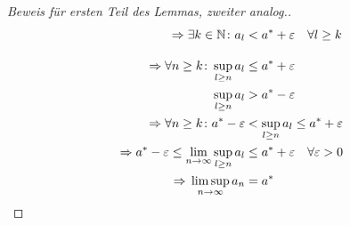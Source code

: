 \begin{lemma}
\begin{proof}[Beweis für ersten Teil des Lemmas, zweiter analog.]
\begin{align*}
            \Rightarrow{} \exists k\in\mathbb{N}\colon a_l &< a^{*} + \varepsilon\quad\forall l\geq k\\[10pt]
            \Rightarrow{} \forall n\geq k\colon \sup_{l\geq n} a_l &\leq a^{*} + \varepsilon\\
            \sup_{l\geq n} a_l &> a^{*} - \varepsilon\\
            \Rightarrow{} \forall n \geq k\colon a^{*} - \varepsilon &< \sup_{l\geq n} a_l \leq a^{*} + \varepsilon\\
            \Rightarrow{} a^{*} - \varepsilon \leq \lim_{n\rightarrow{}\infty} \sup_{l\geq n} a_l &\leq a^{*} + \varepsilon\quad \forall \varepsilon > 0\\
            \Rightarrow{} \limsup_{n\rightarrow{}\infty} a_n &= a^{*}\qedhere
        \end{align*}
    \end{proof}
\end{lemma}

